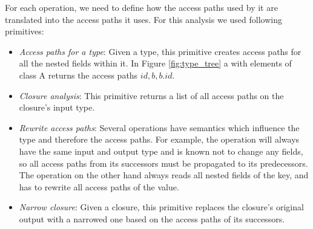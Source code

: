 For each operation, we need to define how the access paths used by it are
translated into the access paths it uses. For this analysis we used following
primitives:
\begin{itemize}
\item \emph{Access paths for a type}: Given a type, this primitive creates
access paths for all the nested fields within it. In Figure \ref{fig:type_tree}
a  with elements of class A returns the access paths
${id, b, b.id}$.
\item \emph{Closure analysis}: This primitive returns a list of all access paths
on the closure's input type.
\item \emph{Rewrite access paths}: Several operations have semantics which
influence the type and therefore the access paths. For example, the 
operation will always have the same input and output type and is known not to
change any fields, so all access paths from its successors must be propagated to
its predecessors. The  operation on the other hand always reads
all nested fields of the key, and has to rewrite all access paths of the value.
\item \emph{Narrow closure}: Given a closure, this primitive replaces the
closure's original output with a narrowed one based on the access paths of its
successors.
\end{itemize}

